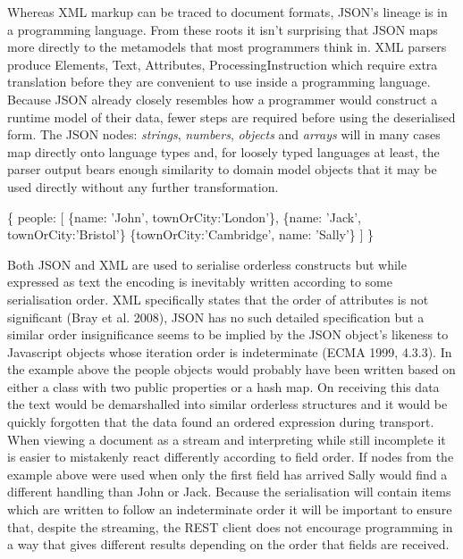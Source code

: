 \documentclass[12pt, ]{article}
\newenvironment{Shaded}{}{}
\newcommand{\DataTypeTok}[1]{\textcolor[rgb]{0.56,0.13,0.00}{{#1}}}
\newcommand{\StringTok}[1]{\textcolor[rgb]{0.25,0.44,0.63}{{#1}}}
\newcommand{\NormalTok}[1]{{#1}}
\begin{document}
Whereas XML markup can be traced to document formats, JSON's lineage is
in a programming language. From these roots it isn't surprising that
JSON maps more directly to the metamodels that most programmers think
in. XML parsers produce Elements, Text, Attributes,
ProcessingInstruction which require extra translation before they are
convenient to use inside a programming language. Because JSON already
closely resembles how a programmer would construct a runtime model of
their data, fewer steps are required before using the deserialised form.
The JSON nodes: \emph{strings}, \emph{numbers}, \emph{objects} and
\emph{arrays} will in many cases map directly onto language types and,
for loosely typed languages at least, the parser output bears enough
similarity to domain model objects that it may be used directly without
any further transformation.

\begin{Shaded}
\begin{Highlighting}[]
\NormalTok{\{}
   \DataTypeTok{people}\NormalTok{: [}
      \NormalTok{\{}\DataTypeTok{name}\NormalTok{: }\StringTok{'John'}\NormalTok{, }\DataTypeTok{townOrCity}\NormalTok{:}\StringTok{'London'}\NormalTok{\},}
      \NormalTok{\{}\DataTypeTok{name}\NormalTok{: }\StringTok{'Jack'}\NormalTok{, }\DataTypeTok{townOrCity}\NormalTok{:}\StringTok{'Bristol'}\NormalTok{\}}
      \NormalTok{\{}\DataTypeTok{townOrCity}\NormalTok{:}\StringTok{'Cambridge'}\NormalTok{, }\DataTypeTok{name}\NormalTok{: }\StringTok{'Sally'}\NormalTok{\}}
   \NormalTok{]}
\NormalTok{\}}
\end{Highlighting}
\end{Shaded}

Both JSON and XML are used to serialise orderless constructs but while
expressed as text the encoding is inevitably written according to some
serialisation order. XML specifically states that the order of
attributes is not significant (Bray et al. 2008), JSON has no such
detailed specification but a similar order insignificance seems to be
implied by the JSON object's likeness to Javascript objects whose
iteration order is indeterminate (ECMA 1999, 4.3.3). In the example
above the people objects would probably have been written based on
either a class with two public properties or a hash map. On receiving
this data the text would be demarshalled into similar orderless
structures and it would be quickly forgotten that the data found an
ordered expression during transport. When viewing a document as a stream
and interpreting while still incomplete it is easier to mistakenly react
differently according to field order. If nodes from the example above
were used when only the first field has arrived Sally would find a
different handling than John or Jack. Because the serialisation will
contain items which are written to follow an indeterminate order it will
be important to ensure that, despite the streaming, the REST client does
not encourage programming in a way that gives different results
depending on the order that fields are received.
\end{document}
